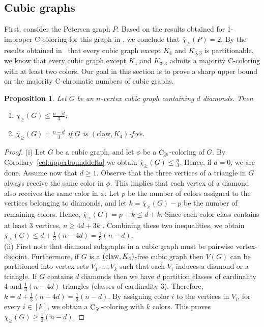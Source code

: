 \documentclass{article}
\newtheorem{proposition}[theorem]{Proposition}
\theoremstyle{definition}
\newcommand{\mc}{\overline{\chi}_{\geqslant}}
\newcommand{\cg}{{\rm C}_{\geqslant}}
\begin{document}
\subsection{Cubic graphs} First, consider the Petersen graph $P$. Based on the results obtained for 1-improper C-coloring for this graph in \cite{BuSaTuPuVa-10}, we conclude that $\mc(P)=2$. By the results obtained in~\cite{BTV-06} that every cubic graph except $K_4$ and $K_{3,3}$ is partitionable, we know that every cubic graph except $K_4$ and $K_{3,3}$ admits a majority C-coloring with at least two colors. Our goal in this section is to prove a sharp upper bound on the majority C-chromatic numbers of  cubic graphs. 
\begin{proposition} \label{prop:cubic}
    Let $G$ be an $n$-vertex cubic graph containing $d$ diamonds. Then 
    \begin{enumerate}
    [label=\normalfont(\roman*)]
        \item $\displaystyle \mc(G)\leq \frac{n-d}{3};$
        \item $\displaystyle\mc(G)=\frac{n-d}{3}$ if $G$ is $(\text{claw}, K_4)$-free. %
    \end{enumerate}
\end{proposition}
\begin{proof}
   (i) Let $G$ be a cubic graph, and let $\phi$ be a $\cg$-coloring  of $G$. By Corollary~\ref{col:upperbounddelta} we obtain $\mc(G)\leq \frac{n}{3}$. Hence, if $d=0$, we are done. Assume now that $d\geq 1$. Observe that the three vertices of a triangle in $G$ always receive the same color in $\phi$. This implies that each vertex of a diamond also receives the same color in $\phi$. Let $p$ be the number of colors assigned to the vertices belonging to diamonds, and let $k=\mc(G)-p$ be the number of remaining colors. Hence, $\mc(G)=p+k\leq d+k$. Since each color class contains at least 3 vertices, $n\geq 4d+3k$ . Combining these two inequalities, we obtain $\mc(G)\leq d+ \frac{1}{3}(n-4d)= \frac{1}{3}(n-d)$. \\
   (ii) First note that diamond subgraphs in a cubic graph must be pairwise vertex-disjoint. Furthermore, if $G$ is a $({\rm claw},K_4)$-free cubic graph then $V(G)$ can be partitioned into vertex sets $V_1, \dots, V_k$ such that each $V_i$ induces a diamond or a triangle. If $G$ contains $d$ diamonds then we have $d$ partition classes of cardinality $4$ and $\frac{1}{3}(n-4d)$ triangles (classes of cardinality $3$). Therefore, $k=d+ \frac{1}{3}(n-4d)= \frac{1}{3}(n-d)$. By assigning color $i$ to the vertices in $V_i$, for every $i \in [k]$, we obtain a $\cg$-coloring with $k$ colors. This proves $\mc(G) \ge \frac{1}{3}(n-d)$.
\end{proof}
\end{document}
